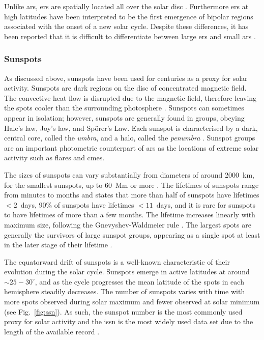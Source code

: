 Unlike \glspl{ar}, \glspl{er} are spatially located all over the solar disc \citep{harvey_solar_2001}. Furthermore \glspl{er} at high latitudes have been interpreted to be the first emergence of bipolar regions associated with the onset of a new solar cycle. Despite these differences, it has been reported that it is difficult to differentiate between large \glspl{er} and small \glspl{ar} \citep{harvey_solar_2001}.



\glsresetall 
{}
\subsubsection*{Sunspots}

As discussed above, sunspots have been used for centuries as a proxy for solar activity. Sunspots are dark regions on the disc of concentrated magnetic field. The convective heat flow is disrupted due to the magnetic field, therefore leaving the spots cooler than the surrounding photosphere \citep{solanki_sunspots_2003, hathaway_solar_2015}. Sunspots can sometimes appear in isolation; however, sunspots are generally found in groups, obeying Hale's law, Joy's law, and Sp\"{o}rer's Law. Each sunspot
is characterised by a dark, central core, called the \textit{umbra}, and a halo, called the \textit{penumbra} \citep{howard_sunspot_2001, solanki_sunspots_2003}. Sunspot groups are an important photometric counterpart of \glspl{ar} as the locations of extreme solar activity such as flares and \glspl{cme}.

The sizes of sunspots can vary substantially from diameters of around 2000~km, for the smallest sunspots, up to 60~Mm or more \citep{howard_sunspot_2001,solanki_sunspots_2003}. The lifetimes of sunspots range from minutes to months \citep{howard_sunspot_2001, solanki_sunspots_2003} and \citet{howard_sunspot_2001} states that more than half of sunspots have lifetimes $<2$~days, $90\%$ of sunspots have lifetimes $<11$~days, and it is rare for sunspots to have lifetimes of more than a few months. The lifetime increases linearly with maximum size, following the Gnevyshev-Waldmeier rule \citep{gnevyshev_notitle_1938, waldmeier_ergebnisse_1955}. The largest spots are generally the survivors of large sunspot groups, appearing as a single spot at least in the later stage of their lifetime \citep{howard_sunspot_2001}.

The equatorward drift of sunspots is a well-known characteristic of their evolution during the solar cycle. Sunspots emerge in active latitudes at around $\sim25-30^{\circ}$, and as the cycle progresses the mean latitude of the spots in each hemisphere steadily decreases. The number of sunspots varies with time with more spots observed during solar maximum and fewer observed at solar minimum (see Fig.~\ref{fig:ssn}). As such, the sunspot number is the most commonly used proxy for solar activity \citep{hathaway_solar_2015} and the \gls{issn} is the most widely used data set due to the length of the available record \citep{hathaway_solar_2015}. 

